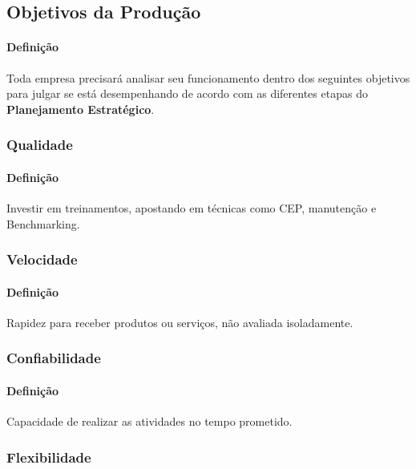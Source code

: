 \documentclass{article}
\begin{document}
        \subsection{Objetivos da Produção}
            \paragraph{Definição}Toda empresa precisará analisar seu funcionamento dentro dos seguintes objetivos para julgar se está desempenhando de acordo com as diferentes etapas do \textbf{Planejamento Estratégico}.

            \subsubsection{Qualidade}
                \paragraph{Definição}Investir em treinamentos, apostando em técnicas como CEP, manutenção e Benchmarking.
                
            \subsubsection{Velocidade}
                \paragraph{Definição}Rapidez para receber produtos ou serviços, não avaliada isoladamente.

            \subsubsection{Confiabilidade}
                \paragraph{Definição}Capacidade de realizar as atividades no tempo prometido.

            \subsubsection{Flexibilidade}
\end{document}
